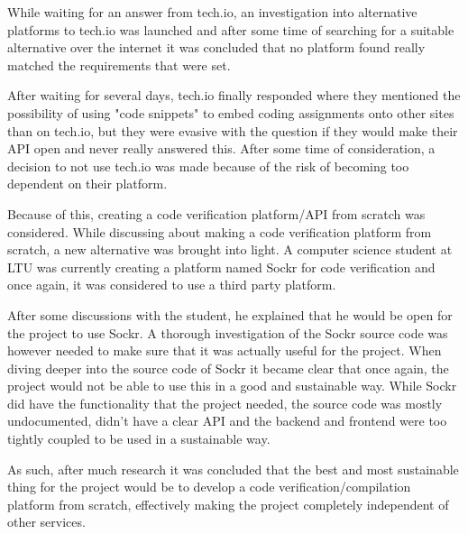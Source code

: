 \documentclass[a4paper,12pt]{article}
\begin{document}

While waiting for an answer from tech.io, an investigation into alternative platforms to tech.io was launched and after some time of searching for a suitable alternative over the internet it was concluded that no platform found really matched the requirements that were set.

After waiting for several days, tech.io finally responded where they mentioned the possibility of using "code snippets" to embed coding assignments onto other sites than on tech.io, but they were evasive with the question if they would make their API open and never really answered this. After some time of consideration, a decision to not use tech.io was made because of the risk of becoming too dependent on their platform.

Because of this, creating a code verification platform/API from scratch was considered. While discussing about making a code verification platform from scratch, a new alternative was brought into light. A computer science student at LTU was currently creating a platform named Sockr for code verification and once again, it was considered to use a third party platform.

After some discussions with the student, he explained that he would be open for the project to use Sockr. A thorough investigation of the Sockr source code was however needed to make sure that it was actually useful for the project. When diving deeper into the source code of Sockr it became clear that once again, the project would not be able to use this in a good and sustainable way. While Sockr did have the functionality that the project needed, the source code was mostly undocumented, didn't have a clear API and the backend and frontend were too tightly coupled to be used in a sustainable way.

As such, after much research it was concluded that the best and most sustainable thing for the project would be to develop a code verification/compilation platform from scratch, effectively making the project completely independent of other services.
\end{document}
